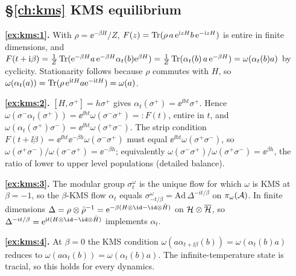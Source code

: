 {\subsection*{\S\ref{ch:kms} KMS equilibrium}
\textbf{\ref{ex:kms:1}.} With $\rho=\ee^{-\beta H}/Z$, $F(z)=\operatorname{Tr}(\rho\,a\,\mathrm{e}^{\mathrm{i} zH}b\,\mathrm{e}^{-\mathrm{i} zH})$ is entire in finite dimensions, and $F(t+\mathrm{i}\beta)=\frac1Z\operatorname{Tr}(\mathrm{e}^{-\beta H}a\,\mathrm{e}^{-\beta H}\alpha_t(b)\mathrm{e}^{\beta H})=\frac1Z\operatorname{Tr}(\alpha_t(b)\,a\,\mathrm{e}^{-\beta H})=\omega(\alpha_t(b)a)$ by cyclicity. Stationarity follows because $\rho$ commutes with $H$, so $\omega(\alpha_t(a))=\operatorname{Tr}(\rho\,\mathrm{e}^{\mathrm{i} tH}a\mathrm{e}^{-\mathrm{i} tH})=\omega(a)$.\par
\textbf{\ref{ex:kms:2}.} $[H,\sigma^+]=h\sigma^+$ gives $\alpha_t(\sigma^+)=\ee^{\ii ht}\sigma^+$. Hence $\omega(\sigma^-\alpha_t(\sigma^+))=\ee^{\ii ht}\omega(\sigma^-\sigma^+)=:F(t)$, entire in $t$, and $\omega(\alpha_t(\sigma^+)\sigma^-)=\ee^{\ii ht}\omega(\sigma^+\sigma^-)$. The strip condition $F(t+\ii\beta)=\ee^{\ii ht}\ee^{-\beta h}\omega(\sigma^-\sigma^+)$ must equal $\ee^{\ii ht}\omega(\sigma^+\sigma^-)$, so $\omega(\sigma^+\sigma^-)/\omega(\sigma^-\sigma^+)=\ee^{-\beta h}$; equivalently $\omega(\sigma^-\sigma^+)/\omega(\sigma^+\sigma^-)=\ee^{\beta h}$, the ratio of lower to upper level populations (detailed balance).\par
\textbf{\ref{ex:kms:3}.} The modular group $\sigma_t^\omega$ is the unique flow for which $\omega$ is KMS at $\beta=-1$, so the $\beta$-KMS flow $\alpha_t$ equals $\sigma^\omega_{-t/\beta}=\mathrm{Ad}\,\Delta^{-it/\beta}$ on $\pi_\omega(\mathcal{A})$. In finite dimensions $\Delta=\rho\otimes\bar\rho^{-1}=\ee^{-\beta(H\otimes\id-\id\otimes\bar H)}$ on $\mathcal{H}\otimes\overline{\mathcal{H}}$, so $\Delta^{-it/\beta}=\ee^{\ii t(H\otimes\id-\id\otimes\bar H)}$ implements $\alpha_t$.\par
\textbf{\ref{ex:kms:4}.} At $\beta=0$ the KMS condition $\omega(a\alpha_{t+\ii\beta}(b))=\omega(\alpha_t(b)a)$ reduces to $\omega(a\alpha_t(b))=\omega(\alpha_t(b)a)$. The infinite-temperature state is tracial, so this holds for every dynamics.\par

}
